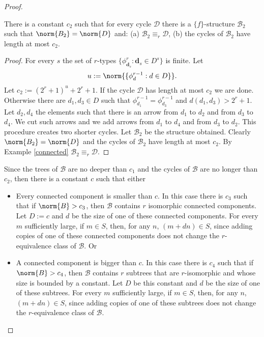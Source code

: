 \begin{lem}
\begin{proof}
\begin{claim}
There is a constant $c_2$ such that for every cycle $\mathcal{D}$ there is a $\{f\}$-structure $\mathcal{B}_2$ such that $\norm{B_2}=\norm{D}$ and: (a) $\mathcal{B}_2 \equiv_r \mathcal{D}$, (b) the cycles of $\mathcal{B}_2$ have length at most $c_2$. 
\begin{proof} 
For every $s$ the set of $r$-types $\{\phi^{r} _{\mathbf{d}_s } : \mathbf{d}_s \in D^s\}$ is finite. 
Let $$u:=\norm{\{\phi^{r-1} _{d} : d \in D\}}\text{.}$$ 
Let $c_2:=(2^r +1)^u +2^r +1$. 
If the cycle $\mathcal{D}$ has length at most $c_2$ we are done. 
Otherwise there are $d_1, d_3 \in D$ such that $\phi^{r-1} _{d_1} = \phi^{r-1} _{d_3}$ and $d(d_1, d_3) > 2^r +1$. 
Let $d_2, d_4$ the elements such that there is an arrow from $d_1 $ to $d_2 $ and from $d_3 $ to $d_4$. 
We cut such arrows and we add arrows from $d_1$ to $d_4$ and from $d_3$ to $d_2$. This procedure creates two shorter cycles.
Let $\mathcal{B}_2$ be the structure obtained. 
Clearly $\norm{B_2}=\norm{D}$ and the cycles of $\mathcal{B}_2$ have length at most $c_2$. 
By Example \ref{connected} $\mathcal{B}_2 \equiv_r \mathcal{D}$. 
\end{proof}
\end{claim}

Since the trees of $\mathcal{B}$ are no deeper than $c_1$ and the cycles of $\mathcal{B}$ are no longer than $c_2$, then there is a constant $c$ such that either
\begin{itemize}
\item Every connected component is smaller than $c$. In this case there is $c_3$ such that if $\norm{B} >c_3$, then $\mathcal{B}$ contains $r$ isomorphic connected components. 
Let $D:=c$ and $d$ be the size of one of these connected components. For every $m$ sufficiently large, if $m \in S$, then, for any $n$, $(m+dn) \in S$, since adding copies of one of these connected components does not change the $r$-equivalence class of $\mathcal{B}$. Or
\item A connected component is bigger than $c$. 
In this case there is $c_4$ such that if $\norm{B} >c_4$, then $\mathcal{B}$ contains $r$ subtrees that are $r$-isomorphic and whose size is bounded by a constant. 
Let $D$ be this constant and $d$ be the size of one of these subtrees. For every $m$ sufficiently large, if $m \in S$, then, for any $n$, $(m+dn) \in S$, since adding copies of one of these subtrees does not change the $r$-equivalence class of $\mathcal{B}$. \qedhere
\end{itemize}
\end{proof}

\end{lem}

